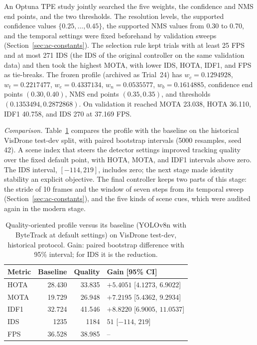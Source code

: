 An Optuna TPE study \cite{akiba2019optuna} jointly searched the five weights, the confidence and NMS end points, and the two thresholds. The resolution levels, the supported confidence values $\{0.25,\dots,0.45\}$, the supported NMS values from 0.30 to 0.70, and the temporal settings were fixed beforehand by validation sweeps (Section~\ref{sec:ac-constants}). The selection rule kept trials with at least 25 FPS and at most 271 IDS (the IDS of the original controller on the same validation data) and then took the highest MOTA, with lower IDS, HOTA, IDF1, and FPS as tie-breaks. The frozen profile (archived as Trial~24) has $w_c=0.1294928$, $w_t=0.2217477$, $w_e=0.4337134$, $w_n=0.0535577$, $w_b=0.1614885$, confidence end points $(0.30,0.40)$, NMS end points $(0.35,0.35)$, and thresholds $(0.1353494, 0.2872868)$. On validation it reached MOTA 23.038, HOTA 36.110, IDF1 40.758, and IDS 270 at 37.169 FPS.

\emph{Comparison.} Table~\ref{tab:ac-quality} compares the profile with the baseline on the historical VisDrone test-dev split, with paired bootstrap intervals (5000 resamples, seed 42). A scene index that steers the detector settings improved tracking quality over the fixed default point, with HOTA, MOTA, and IDF1 intervals above zero. The IDS interval, $[-114, 219]$, includes zero; the next stage made identity stability an explicit objective. The final controller keeps two parts of this stage: the stride of 10 frames and the window of seven steps from its temporal sweep (Section~\ref{sec:ac-constants}), and the five kinds of scene cues, which were audited again in the modern stage.

\begin{table}[tbp]
\centering
\caption{Quality-oriented profile versus its baseline (YOLOv8n with ByteTrack at default settings) on VisDrone test-dev, historical protocol. Gain: paired bootstrap difference with 95\% interval; for IDS it is the reduction.}
\label{tab:ac-quality}
\begin{tabular}{lrrl}
\toprule
Metric & Baseline & Quality & Gain [95\% CI]\\
\midrule
HOTA & 28.430 & 33.835 & $+5.4051$ [$4.1273$, $6.9022$]\\
MOTA & 19.729 & 26.948 & $+7.2195$ [$5.4362$, $9.2934$]\\
IDF1 & 32.724 & 41.546 & $+8.8220$ [$6.9005$, $11.0537$]\\
IDS & 1235 & 1184 & $51$ [$-114$, $219$]\\
FPS & 36.528 & 38.985 & --\\
\bottomrule
\end{tabular}
\end{table}

